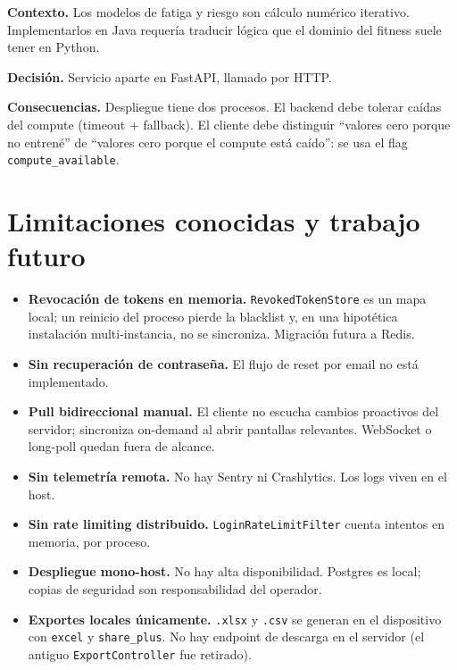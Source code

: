\documentclass[11pt,a4paper]{article}
\newcommand{\cls}[1]{\texttt{\small #1}}
\begin{document}
\textbf{Contexto.} Los modelos de fatiga y riesgo son cálculo numérico iterativo. Implementarlos en Java requería traducir lógica que el dominio del fitness suele tener en Python.

\textbf{Decisión.} Servicio aparte en FastAPI, llamado por HTTP.

\textbf{Consecuencias.} Despliegue tiene dos procesos. El backend debe tolerar caídas del compute (timeout + fallback). El cliente debe distinguir ``valores cero porque no entrené'' de ``valores cero porque el compute está caído'': se usa el flag \texttt{compute\_available}.

\section{Limitaciones conocidas y trabajo futuro}

\begin{itemize}[leftmargin=*]
  \item \textbf{Revocación de tokens en memoria.} \cls{RevokedTokenStore} es un mapa local; un reinicio del proceso pierde la blacklist y, en una hipotética instalación multi-instancia, no se sincroniza. Migración futura a Redis.
  \item \textbf{Sin recuperación de contraseña.} El flujo de reset por email no está implementado.
  \item \textbf{Pull bidireccional manual.} El cliente no escucha cambios proactivos del servidor; sincroniza on-demand al abrir pantallas relevantes. WebSocket o long-poll quedan fuera de alcance.
  \item \textbf{Sin telemetría remota.} No hay Sentry ni Crashlytics. Los logs viven en el host.
  \item \textbf{Sin rate limiting distribuido.} \cls{LoginRateLimitFilter} cuenta intentos en memoria, por proceso.
  \item \textbf{Despliegue mono-host.} No hay alta disponibilidad. Postgres es local; copias de seguridad son responsabilidad del operador.
  \item \textbf{Exportes locales únicamente.} \texttt{.xlsx} y \texttt{.csv} se generan en el dispositivo con \texttt{excel} y \texttt{share\_plus}. No hay endpoint de descarga en el servidor (el antiguo \cls{ExportController} fue retirado).
\end{itemize}
\end{document}
